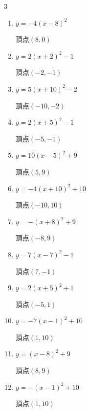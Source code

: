\begin{multicols}{3}
\begin{enumerate}
  \item $\displaystyle y=-4\left( x-8\right)^{2}$

        $\displaystyle 頂点\left( 8 , 0 \right)$

  \item $\displaystyle y=2\left( x+2\right)^{2}-1$

        $\displaystyle 頂点\left( -2 , -1 \right)$

  \item $\displaystyle y=5\left( x+10\right)^{2}-2$

        $\displaystyle 頂点\left( -10 , -2 \right)$

  \item $\displaystyle y=2\left( x+5\right)^{2}-1$

        $\displaystyle 頂点\left( -5 , -1 \right)$

  \item $\displaystyle y=10\left( x-5\right)^{2}+9$

        $\displaystyle 頂点\left( 5 , 9 \right)$

  \item $\displaystyle y=-4\left( x+10\right)^{2}+10$

        $\displaystyle 頂点\left( -10 , 10 \right)$

  \item $\displaystyle y=-\left( x+8\right)^{2}+9$

        $\displaystyle 頂点\left( -8 , 9 \right)$

  \item $\displaystyle y=7\left( x-7\right)^{2}-1$

        $\displaystyle 頂点\left( 7 , -1 \right)$

  \item $\displaystyle y=2\left( x+5\right)^{2}+1$

        $\displaystyle 頂点\left( -5 , 1 \right)$

  \item $\displaystyle y=-7\left( x-1\right)^{2}+10$

        $\displaystyle 頂点\left( 1 , 10 \right)$

  \item $\displaystyle y=\left( x-8\right)^{2}+9$

        $\displaystyle 頂点\left( 8 , 9 \right)$

  \item $\displaystyle y=-\left( x-1\right)^{2}+10$

        $\displaystyle 頂点\left( 1 , 10 \right)$


\end{enumerate}
\end{multicols}
